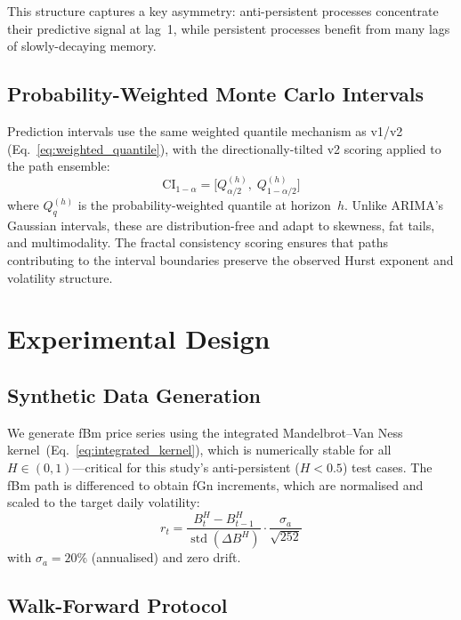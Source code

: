 \documentclass[12pt,a4paper]{article}
\begin{document}
This structure captures a key asymmetry: anti-persistent processes
concentrate their predictive signal at lag~1, while persistent processes
benefit from many lags of slowly-decaying memory.

\subsection{Probability-Weighted Monte Carlo Intervals}

Prediction intervals use the same weighted quantile mechanism as v1/v2
(Eq.~\ref{eq:weighted_quantile}), with the directionally-tilted v2
scoring applied to the path ensemble:
\begin{equation}
  \text{CI}_{1-\alpha} = \bigl[Q^{(h)}_{\alpha/2},\;
                                Q^{(h)}_{1-\alpha/2}\bigr]
  \label{eq:mc_ci}
\end{equation}
where $Q^{(h)}_q$ is the probability-weighted quantile at horizon~$h$.
Unlike ARIMA's Gaussian intervals, these are distribution-free and adapt
to skewness, fat tails, and multimodality.  The fractal consistency
scoring ensures that paths contributing to the interval boundaries
preserve the observed Hurst exponent and volatility structure.

\section{Experimental Design}
\label{sec:design}

\subsection{Synthetic Data Generation}

We generate fBm price series using the integrated Mandelbrot--Van Ness
kernel~(Eq.~\ref{eq:integrated_kernel}), which is numerically stable for
all $H \in (0,1)$---critical for this study's anti-persistent ($H < 0.5$)
test cases.  The fBm path is differenced to obtain fGn increments, which
are normalised and scaled to the target daily volatility:
\begin{equation}
  r_t = \frac{B^H_t - B^H_{t-1}}{\operatorname{std}(\Delta B^H)}
        \cdot \frac{\sigma_a}{\sqrt{252}}
  \label{eq:synthetic_returns}
\end{equation}
with $\sigma_a = 20\%$ (annualised) and zero drift.

\subsection{Walk-Forward Protocol}
\end{document}

